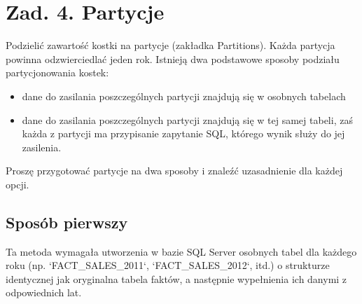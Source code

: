 \documentclass[a4paper,12pt]{article}
\begin{document}
\section{Zad. 4. Partycje}

Podzielić zawartość kostki na partycje (zakładka Partitions). Każda partycja powinna
odzwierciedlać jeden rok. Istnieją dwa podstawowe sposoby podziału partycjonowania kostek:
\begin{itemize}
  \item dane do zasilania poszczególnych partycji znajdują się w osobnych tabelach
  \item dane do zasilania poszczególnych partycji znajdują się w tej samej tabeli, zaś każda z partycji ma przypisanie zapytanie SQL, którego wynik służy do jej zasilenia.
\end{itemize}
Proszę przygotować partycje na dwa sposoby i znaleźć uzasadnienie dla każdej opcji.

\subsection{Sposób pierwszy}

Ta metoda wymagała utworzenia w bazie SQL Server osobnych tabel dla każdego roku (np. `FACT\_SALES\_2011`, `FACT\_SALES\_2012`, itd.)
o strukturze identycznej jak oryginalna tabela faktów, a następnie wypełnienia ich danymi z odpowiednich lat.
\end{document}
